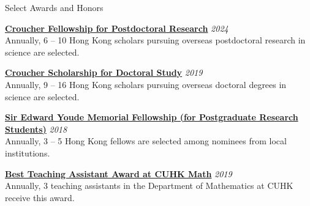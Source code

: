 \documentclass{resume} %
\begin{document}
\begin{rSection}{Select Awards and Honors}

\href{https://scholars.croucher.org.hk/scholars/siu-chun-yin}{\textbf{Croucher Fellowship for Postdoctoral Research}} \hfill {\em 2024}\\
Annually, 6 -- 10 Hong Kong scholars pursuing overseas postdoctoral research in science are selected.

\href{https://scholars.croucher.org.hk/scholars/siu-chun-yin}{\textbf{Croucher Scholarship for Doctoral Study}} \hfill {\em 2019}\\
Annually, 9 -- 16 Hong Kong scholars pursuing overseas doctoral degrees in science are selected.

\href{https://www.wfsfaa.gov.hk/sfo/seymf/en/index.htm}{\textbf{Sir Edward Youde Memorial Fellowship (for Postgraduate Research Students)}} \hfill {\em 2018}\\
Annually, 3 -- 5 Hong Kong fellows are selected among nominees from local institutions.

\href{https://www.math.cuhk.edu.hk/student-centre/scholarships/best-teaching-assistant-award}{\textbf{Best Teaching Assistant Award at CUHK Math}} \hfill {\em 2019}\\
Annually, 3 teaching assistants in the Department of Mathematics at CUHK receive this award.

\end{rSection}
\end{document}
